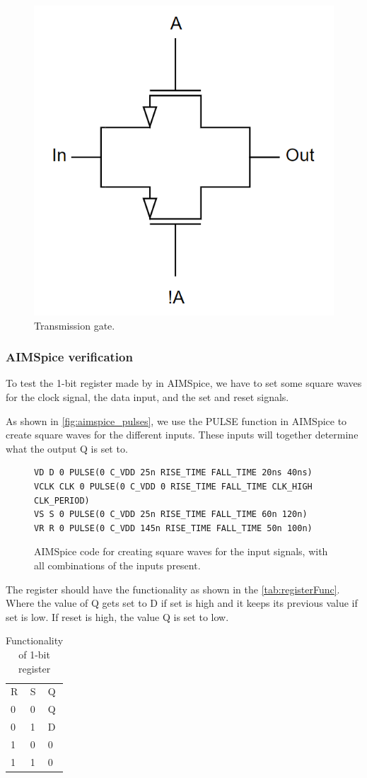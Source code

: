 \begin{figure}[H]
    \centering
    \includegraphics[width=0.4\linewidth]{Figures/Transmission gate.png}
    \caption{Transmission gate.}
    \label{fig:TransGate}
\end{figure}


\subsubsection{AIMSpice verification}
\label{subsubsec:aimspice_testing}
To test the 1-bit register made by in AIMSpice, we have to set some square waves for the clock signal, the data input, and the set and reset signals.

As shown in \autoref{fig:aimspice_pulses}, we use the PULSE function in AIMSpice to create square waves for the different inputs. These inputs will together determine what the output Q is set to.

\begin{figure}[H]
\centering
\begin{minipage}{0.9\textwidth}
\begin{lstlisting}[style=aimspiceStyle]
VD D 0 PULSE(0 C_VDD 25n RISE_TIME FALL_TIME 20ns 40ns)
VCLK CLK 0 PULSE(0 C_VDD 0 RISE_TIME FALL_TIME CLK_HIGH CLK_PERIOD)
VS S 0 PULSE(0 C_VDD 25n RISE_TIME FALL_TIME 60n 120n)
VR R 0 PULSE(0 C_VDD 145n RISE_TIME FALL_TIME 50n 100n)
\end{lstlisting}
\end{minipage}
\caption{AIMSpice code for creating square waves for the input signals, with all combinations of the inputs present.}
\label{fig:aimspice_pulses}
\end{figure}

The register should have the functionality as shown in the \autoref{tab:registerFunc}. Where the value of Q gets set to D if set is high and it keeps its previous value if set is low. If reset is high, the value Q is set to low. 

\begin{table}[H]
\centering
\caption{Functionality of 1-bit register}
\label{tab:registerFunc}
\begin{tabular}{|l|l|l|}
\cline{1-3}
\rowcolor[HTML]{C0C0C0} 
R & S & Q  \\ \cline{1-3}
0 & 0 & Q  \\ \cline{1-3}
0 & 1 & D  \\ \cline{1-3}
1 & 0 & 0  \\ \cline{1-3}
1 & 1 & 0  \\ \cline{1-3}
\end{tabular}
\end{table}


